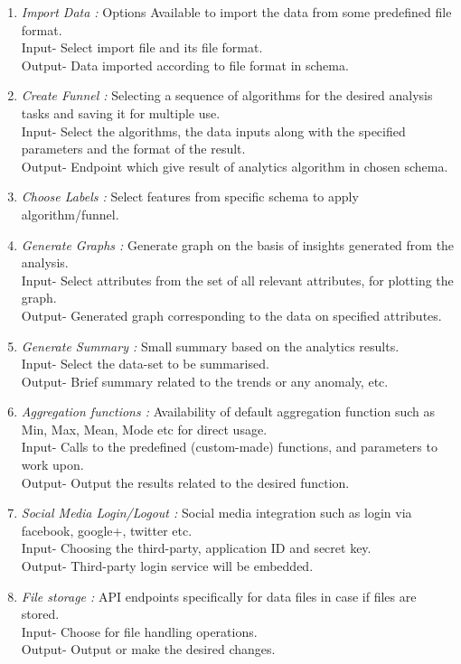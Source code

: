 \documentclass[a4paper,12pt]{report}
\begin{document}
\begin{enumerate}
{        Input- Select schema or info to export and file format.\\
        Output- Export data in standard file format eg csv, xml, json etc.  
      }
      \item {\emph {Import Data :}  Options Available to import the data from some predefined file format. \\
        Input- Select import file and its file format. \\
        Output- Data imported according to file format in schema.
      }
      \vfill
      \item {\emph {Create Funnel :}  Selecting a sequence of algorithms for the desired analysis tasks and saving it for multiple use.\\
      Input- Select the algorithms, the data inputs along with the specified parameters and the format of the result. \\
      Output- Endpoint which give result of analytics algorithm in chosen schema.  
      }
      \item { \emph {Choose Labels :} Select features from specific schema to apply algorithm/funnel. }
      \item {\emph {Generate Graphs :}   Generate graph on the basis of insights generated from the analysis. \\
        Input- Select attributes from the set of all relevant attributes, for plotting the graph.\\
        Output- Generated graph corresponding to the data on specified attributes.
      }
      \item {\emph {Generate Summary :}    Small summary based on the analytics results. \\
      Input- Select the data-set to be summarised.\\
      Output- Brief summary related to the trends or any anomaly, etc.
      }
      \item {\emph {Aggregation functions :} Availability of default aggregation function such as Min, Max, Mean, Mode etc for direct usage. \\
        Input- Calls to the predefined (custom-made) functions, and parameters to work upon. \\
        Output- Output the results related to the desired function.
      }
      \item {\emph {Social Media Login/Logout :} Social media integration such as login via facebook, google+, twitter etc. \\
        Input- Choosing the third-party, application ID and secret key. \\
        Output- Third-party login service will be embedded.
      }
      \item {\emph {File storage : } API endpoints specifically for data files in case if files are stored. \\
        Input- Choose for file handling operations. \\
        Output- Output or make the desired changes.
      }
      \end{enumerate}
    \vfill
\end{document}
